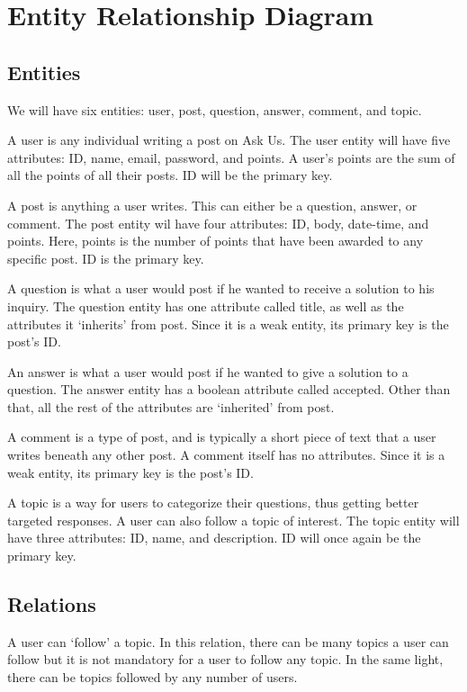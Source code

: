 \section{Entity Relationship Diagram}
\subsection{Entities}
We will have six entities: user, post, question, answer, comment, and topic.

A user is any individual writing a post on Ask Us. The user entity will have five attributes: ID, name, email, password, and points. A user's points are the sum of all the points of all their posts. ID will be the primary key.

A post is anything a user writes. This can either be a question, answer, or comment. The post entity wil have four attributes: ID, body, date-time, and points. Here, points is the number of points that have been awarded to any specific post. ID is the primary key.

A question is what a user would post if he wanted to receive a solution to his inquiry. The question entity has one attribute called title, as well as the attributes it `inherits' from post. Since it is a weak entity, its primary key is the post's ID.

An answer is what a user would post if he wanted to give a solution to a question. The answer entity has a boolean attribute called accepted. Other than that, all the rest of the attributes are `inherited' from post.

A comment is a type of post, and is typically a short piece of text that a user writes beneath any other post. A comment itself has no attributes. Since it is a weak entity, its primary key is the post's ID.

A topic is a way for users to categorize their questions, thus getting better targeted responses. A user can also follow a topic of interest. The topic entity will have three attributes: ID, name, and description. ID will once again be the primary key.

\subsection{Relations}
A user can `follow' a topic. In this relation, there can be many topics a user can follow but it is not mandatory for a user to follow any topic. In the same light, there can be topics followed by any number of users.

